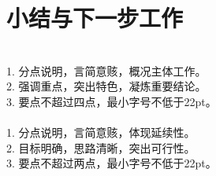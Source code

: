 \documentclass[10pt,aspectratio=169]{beamer}
\begin{document}
\section{小结与下一步工作}
\begin{frame}
\begin{HUSTRequirementFrame}
\\
1. \quad 分点说明，言简意赅，概况主体工作。\\
2. \quad 强调重点，突出特色，凝炼重要结论。\\
3. \quad 要点不超过四点，最小字号不低于22pt。\\[.25in]
\\
1. \quad 分点说明，言简意赅，体现延续性。\\
2. \quad 目标明确，思路清晰，突出可行性。\\
3. \quad 要点不超过两点，最小字号不低于22pt。
\end{HUSTRequirementFrame}
\end{frame}

\HUSTReferencesFrame

\HUSTThanksFrame
\end{document}
